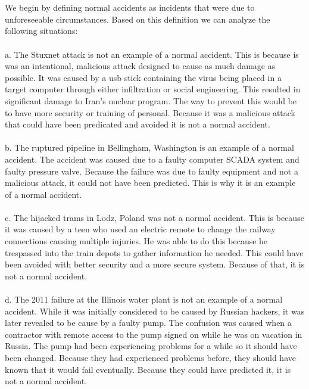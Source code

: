 \documentclass[letterpaper]{article}
\begin{document}
\section{}
We begin by defining normal accidents as incidents that were due to unforeseeable circumstances. Based on this definition we can analyze the following situations: 
\\
\\
a. The Stuxnet attack is not an example of a normal accident. This is because is was an intentional, malicious attack designed to cause as much damage as possible. It was caused by a usb stick containing the virus being placed in a target computer through either infiltration or social engineering. This resulted in significant damage to Iran's nuclear program. The way to prevent this would be to have more security or training of personal. Because it was a malicious attack that could have been predicated and avoided it is not a normal accident.
\\
\\
b. The ruptured pipeline in Bellingham, Washington is an example of a normal accident. The accident was caused due to a faulty computer SCADA system and faulty pressure valve. Because the failure was due to faulty equipment and not a malicious attack, it could not have been predicted. This is why it is an example of a normal accident.
\\
\\
c. The hijacked trams in Lodz, Poland was not a normal accident. This is because it was caused by a teen who used an electric remote to change the railway connections causing multiple injuries. He was able to do this because he trespassed into the train depots to gather information he needed. This could have been avoided with better security and a more secure system. Because of that, it is not a normal accident.
\\
\\
d. The 2011 failure at the Illinois water plant is not an example of a normal accident. While it was initially considered to be caused by Russian hackers, it was later revealed to be cause by a faulty pump. The confusion was caused when a contractor with remote access to the pump signed on while he was on vacation in Russia. The pump had been experiencing problems for a while so it should have been changed. Because they had experienced problems before, they should have known that it would fail eventually. Because they could have predicted it, it is not a normal accident. 
\end{document}
